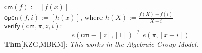 \documentclass[shadesubsections,trans,14pt,mathserif]{beamer}
\newcommand{\enc}[1]{\ensuremath{\left[#1\right ]}}
\newcommand{\cm}{\ensuremath{\mathsf{cm}}}
\newcommand{\open}[1]{\ensuremath{\mathsf{open}(#1)}}
\newcommand{\verify}[1]{\ensuremath{\mathsf{verify}(#1)}}
\newcommand{\defeq}{\ensuremath{:=}}
\begin{document}
 


\begin{frame}

 $\cm(f)\defeq   \enc{f(x)}$\\
 \vspace{0.4in}
$\open{f,i}\defeq \enc{h(x)}$, where
 $h(X)\defeq \frac{f(X)-f(i)}{X-i}$\\
 \vspace{0.4in}
 $\verify{\cm,\pi,z,i}:$
\[e(\cm-\enc{z},\enc{1}) \stackrel{?}{=} e(\pi, \enc{x-i})\]
 \vspace{0.4in}
\textbf{Thm}{\footnotesize{[KZG,MBKM]}}: \emph{This works in the Algebraic Group Model.}
 \end{frame}
\end{document}
